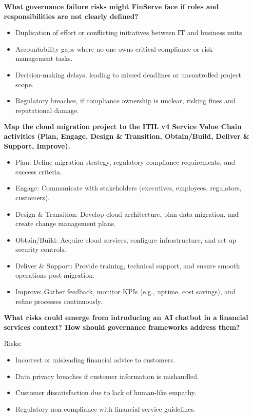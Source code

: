 \bigskip

\noindent\textbf{What governance failure risks might FinServe face if roles and responsibilities are not clearly defined?}


\begin{itemize}
    \item Duplication of effort or conflicting initiatives between IT and business units. 
    \item Accountability gaps where no one owns critical compliance or risk management tasks. 
    \item Decision-making delays, leading to missed deadlines or uncontrolled project scope. 
    \item Regulatory breaches, if compliance ownership is unclear, risking fines and reputational damage.
\end{itemize}


\bigskip

\noindent\textbf{Map the cloud migration project to the ITIL v4 Service Value Chain activities (Plan, Engage, Design \& Transition, Obtain/Build, Deliver \& Support, Improve).}


\begin{itemize}
    \item Plan: Define migration strategy, regulatory compliance requirements, and success criteria.
    \item Engage: Communicate with stakeholders (executives, employees, regulators, customers).
    \item Design \& Transition: Develop cloud architecture, plan data migration, and create change management plans.
    \item Obtain/Build: Acquire cloud services, configure infrastructure, and set up security controls.
    \item Deliver \& Support: Provide training, technical support, and ensure smooth operations post-migration.
    \item Improve: Gather feedback, monitor KPIs (e.g., uptime, cost savings), and refine processes continuously.
\end{itemize}


\bigskip

\noindent\textbf{What risks could emerge from introducing an AI chatbot in a financial services context? How should governance frameworks address them?}


Risks:
\begin{itemize}
    \item Incorrect or misleading financial advice to customers.
    \item Data privacy breaches if customer information is mishandled.
    \item Customer dissatisfaction due to lack of human-like empathy.
    \item Regulatory non-compliance with financial service guidelines.
\end{itemize}

